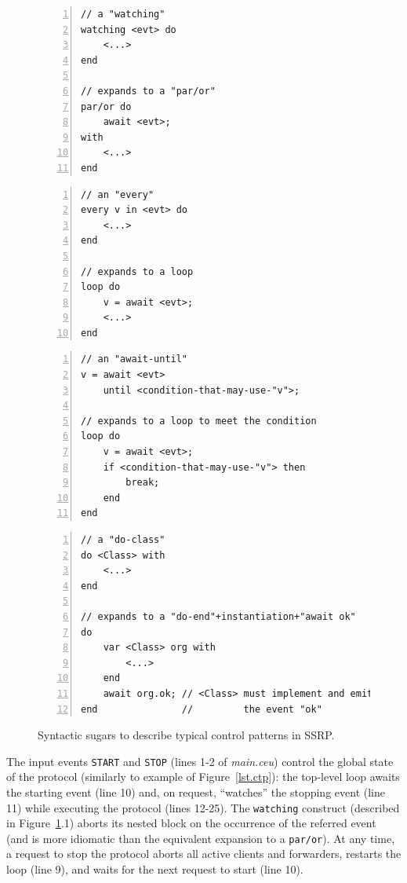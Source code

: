 \documentclass{sigplanconf}
\newcommand{\code}[1] {{\small{\texttt{#1}}}}
\newcommand{\1}{\;}
\newcommand{\2}{\;\;}
\newcommand{\3}{\;\;\;}
\newcommand{\5}{\;\;\;\;\;}
\begin{document}
\begin{figure}%
\begin{lstlisting}[numbers=left,xleftmargin=3em,title=(1) A \code{watching} 
expands to a \code{par/or}.]
// a "watching"
watching <evt> do
    <...>
end

// expands to a "par/or"
par/or do
    await <evt>;
with
    <...>
end
\end{lstlisting}
\begin{lstlisting}[numbers=left,xleftmargin=3em,title=(2) An \code{every} 
expands to a \code{loop}.]
// an "every"
every v in <evt> do
    <...>
end

// expands to a loop
loop do
    v = await <evt>;
    <...>
end
\end{lstlisting}
\begin{lstlisting}[numbers=left,xleftmargin=3em,title=(3) An \code{await-until} 
expands to a \code{loop} to meet the condition.]
// an "await-until"
v = await <evt>
    until <condition-that-may-use-"v">;

// expands to a loop to meet the condition
loop do
    v = await <evt>;
    if <condition-that-may-use-"v"> then
        break;
    end
end
\end{lstlisting}
\begin{lstlisting}[numbers=left,xleftmargin=3em,title=(4) A \code{do-<class>} 
waits for the organism to terminate.]
// a "do-class"
do <Class> with
    <...>
end

// expands to a "do-end"+instantiation+"await ok"
do
    var <Class> org with
        <...>
    end
    await org.ok; // <Class> must implement and emit
end               //         the event "ok"
\end{lstlisting}
\caption{ Syntactic sugars to describe typical control patterns in SSRP.
\label{fig.sugars}
}
\end{figure}


The input events \code{START} and \code{STOP} (lines 1-2 of \emph{main.ceu}) 
control the global state of the protocol (similarly to example of 
Figure~\ref{lst.ctp}):
the top-level loop awaits the starting event (line 10) and, on request, 
``watches'' the stopping event (line 11) while executing the protocol (lines 
12-25).
The \code{watching} construct (described in Figure~\ref{fig.sugars}.1) aborts 
its nested block on the occurrence of the referred event (and is more idiomatic 
than the equivalent expansion to a \code{par/or}).
%
At any time, a request to stop the protocol aborts all active clients and 
forwarders, restarts the loop (line 9), and waits for the next request to start 
(line 10).
\end{document}
